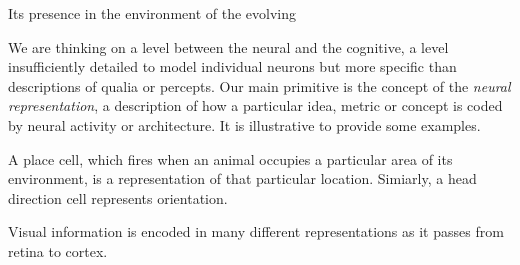 \documentclass{jov}
\begin{document}
Its presence in the environment of the evolving 


We are thinking on a level between the neural and the cognitive, a level insufficiently detailed to model individual neurons but more specific than descriptions of qualia or percepts. Our main primitive is the concept of the \textit{neural representation}, a description of how a particular idea, metric or concept is coded by neural activity or architecture. It is illustrative to provide some examples.


A place cell, which fires when an animal occupies a particular area of its environment, is a representation of that particular location. Simiarly, a head direction cell represents orientation.

Visual information is encoded in many different representations as it passes from retina to cortex.






\end{document}
